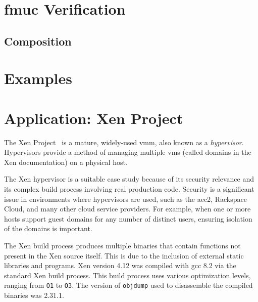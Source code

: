 \section{\acs*{fmuc} Verification}\label{se:fmuc_ver}




\subsection{Composition}\label{sse:fmuc_comp}

\section{Examples}\label{se:syntax_example}

\section{Application: Xen Project}\label{se:xen}
The Xen Project~\citep{chisnall2008definitive}%
is a mature, widely-used \ac{vmm}, also known as a \emph{hypervisor}.%
Hypervisors provide a method of managing multiple
\acp{vm} (called domains in the Xen documentation) on a physical host.%

The Xen hypervisor is a suitable case study because of its security relevance%
and its complex build process involving real production code.
Security is a significant issue in environments where hypervisors are used,
such as the \ac{aec2}, Rackspace Cloud, and many other cloud service providers.
For example, when one or more hosts support guest domains
for any number of distinct users,
ensuring isolation of the domains is important.

The Xen build process produces multiple binaries
that contain functions not present in the Xen source itself.
This is due to the inclusion of external static libraries and programs.
Xen version 4.12 was compiled with \ac{gcc} 8.2 via the standard Xen build process.
This build process uses various optimization levels,
ranging from \texttt{O1} to \texttt{O3}.
The version of \texttt{objdump} used to disassemble the compiled binaries
was 2.31.1.%

